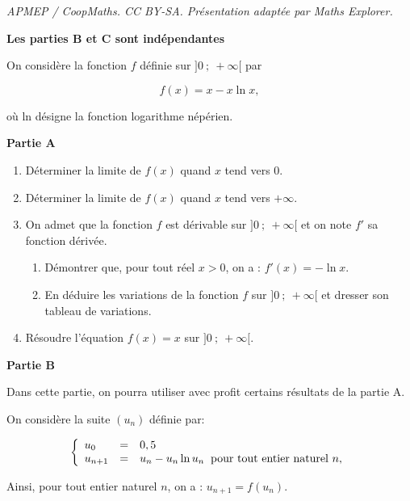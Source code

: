\documentclass[10pt]{article}
\begin{document}
\noindent\textit{APMEP / CoopMaths. CC BY-SA. Présentation adaptée par Maths Explorer.}\par\medskip
\medskip

\textbf{Les parties B et C sont indépendantes}

\medskip

On considère la fonction $f$  définie sur $]0~;~+\infty[$ par

\[f(x) = x - x \ln x,\]

où ln désigne la fonction logarithme népérien.

\bigskip

\textbf{Partie A}

\medskip

\begin{enumerate}
\item Déterminer la limite de $f(x)$ quand $x$ tend vers $0$.
\item Déterminer la limite de $f(x)$ quand $x$ tend vers $+\infty$.
\item On admet que la fonction $f$ est dérivable sur $]0~;~+\infty[$ et on note $f'$ sa fonction dérivée.
	\begin{enumerate}
		\item Démontrer que, pour tout réel $x > 0$, on a : $f'(x) = - \ln x$.
		\item En déduire les variations de la fonction $f$ sur $]0~;~+\infty[$ et dresser son tableau de variations.
	\end{enumerate}
\item Résoudre l'équation $f(x) = x$ sur $]0~;~+\infty[$.
\end{enumerate}

\bigskip

\textbf{Partie B}

\medskip

Dans cette partie, on pourra utiliser avec profit certains résultats de la partie A.

On considère la suite $\left(u_n\right)$ définie par:

\[\left\{\begin{array}{l c l}
u_0 &=& 0,5\\
u_{n+1} &=& u_n - u_n \ln u_n \:\text{ pour tout entier naturel } n,
\end{array}\right.\]

Ainsi, pour tout entier naturel $n$, on a : $u_{n+1} = f\left(u_n\right)$.

\medskip
\end{document}
